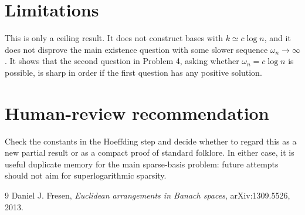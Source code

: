 \documentclass[11pt]{article}
\begin{document}
\section*{Limitations}

This is only a ceiling result.  It does not construct bases with
$k\simeq c\log n$, and it does not disprove the main existence question with
some slower sequence $\omega_n\to\infty$.  It shows that the second question
in Problem 4, asking whether $\omega_n=c\log n$ is possible, is sharp in
order if the first question has any positive solution.

\section*{Human-review recommendation}

Check the constants in the Hoeffding step and decide whether to regard this
as a new partial result or as a compact proof of standard folklore.  In
either case, it is useful duplicate memory for the main sparse-basis problem:
future attempts should not aim for superlogarithmic sparsity.

\begin{thebibliography}{9}
Daniel J. Fresen,
\emph{Euclidean arrangements in Banach spaces},
arXiv:1309.5526, 2013.
\end{thebibliography}
\end{document}
